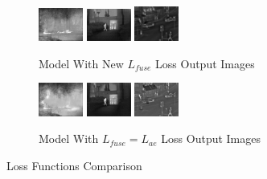 \begin{figure}[htbp]
    \begin{subfigure}[b]{\textwidth}
        \includegraphics[width=0.16\textwidth, height=0.1\textheight]{imgs/ch5/ours/20.jpg}
        \includegraphics[width=0.16\textwidth, height=0.1\textheight]{imgs/ch5/ours/12.jpg}
        \includegraphics[width=0.16\textwidth, height=0.1\textheight]{imgs/ch5/ours/02.jpg}
        \captionsetup{justification=raggedright,singlelinecheck=false}
        \caption{Model With New $L_{fuse}$ Loss Output Images}
        \label{fig:ch5:met2:ours}
    \end{subfigure}
    \vspace{0.01cm}
        \begin{subfigure}[b]{\textwidth}
        \includegraphics[width=0.16\textwidth, height=0.1\textheight]{imgs/ch5/sameLoss/20.png}
        \includegraphics[width=0.16\textwidth, height=0.1\textheight]{imgs/ch5/sameLoss/12.png}
        \includegraphics[width=0.16\textwidth, height=0.1\textheight]{imgs/ch5/sameLoss/02.png}
        \captionsetup{justification=raggedright,singlelinecheck=false}
        \caption{Model With $ L_{fuse} = L_{ae}$ Loss Output Images}
        \label{fig:ch5:met2:sameLoss}
    \end{subfigure}
    \captionsetup{justification=raggedright,singlelinecheck=false}
        \caption{Loss Functions Comparison}
    \label{fig:ch5:met2}
\end{figure}

